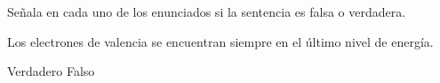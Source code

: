 Señala en cada uno de los enunciados si la sentencia es falsa o verdadera.

\begin{multicols}{2}
    \begin{parts}








        Los electrones de valencia se encuentran siempre en el último
        nivel de energía.

        \begin{oneparcheckboxes}
            \CorrectChoice Verdadero
            \choice Falso
        \end{oneparcheckboxes}




\end{parts}
\end{multicols}

